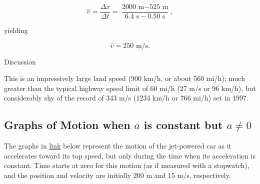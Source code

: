 \documentclass[
]{book}
\begin{document}
\leavevmode{}%
\[{{{\overset{-}{v} = \frac{\Delta x}{\Delta t}} = \frac{\text{2000\ m} - \text{525\ m}}{6\text{.}{\text{4\ s} - 0}\text{.}\text{50\ s}}},}{}\]

yielding

\leavevmode{}%
\[{{\overset{-}{v} = \text{250\ m/s}}.}{}\]

{Discussion}

This is an impressively large land speed (900 km/h, or about 560 mi/h):
much greater than the typical highway speed limit of 60 mi/h (27 m/s or
96 km/h), but considerably shy of the record of 343 m/s (1234 km/h or
766 mi/h) set in 1997.

\hypertarget{fs-id2570304}{}
\hypertarget{graphs-of-motion-when-a-is-constant-but-a-neq-0}{%
\subsection{\texorpdfstring{Graphs of Motion when \(a{}\) is constant but \({a \neq 0}{}\)}{Graphs of Motion when a\{\} is constant but \{a \textbackslash neq 0\}\{\}}}\label{graphs-of-motion-when-a-is-constant-but-a-neq-0}}

The graphs in \protect\hyperlink{import-auto-id3596921}{link}
below represent the motion of the jet-powered car as it accelerates
toward its top speed, but only during the time when its acceleration is
constant. Time starts at zero for this motion (as if measured with a
stopwatch), and the position and velocity are initially 200 m and 15
m/s, respectively.
\end{document}
